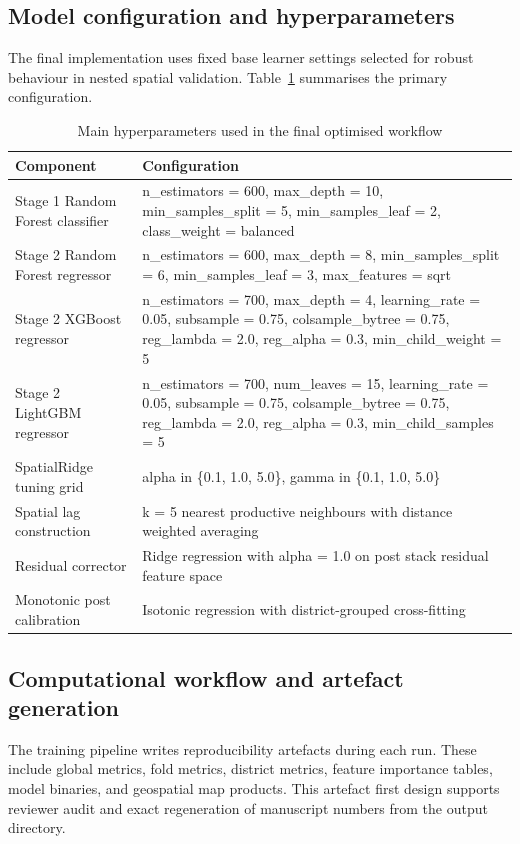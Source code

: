 \documentclass[preprint,12pt]{elsarticle}
\begin{document}
\subsection{Model configuration and hyperparameters}
The final implementation uses fixed base learner settings selected for robust behaviour in nested spatial validation. Table~\ref{tab:hyperparams} summarises the primary configuration.

\begin{table}[h]
\centering
\caption{Main hyperparameters used in the final optimised workflow}
\label{tab:hyperparams}
\begin{tabular}{p{4.1cm}p{9.8cm}}
\toprule
Component & Configuration \\
\midrule
Stage 1 Random Forest classifier & n\_estimators = 600, max\_depth = 10, min\_samples\_split = 5, min\_samples\_leaf = 2, class\_weight = balanced \\
Stage 2 Random Forest regressor & n\_estimators = 600, max\_depth = 8, min\_samples\_split = 6, min\_samples\_leaf = 3, max\_features = sqrt \\
Stage 2 XGBoost regressor & n\_estimators = 700, max\_depth = 4, learning\_rate = 0.05, subsample = 0.75, colsample\_bytree = 0.75, reg\_lambda = 2.0, reg\_alpha = 0.3, min\_child\_weight = 5 \\
Stage 2 LightGBM regressor & n\_estimators = 700, num\_leaves = 15, learning\_rate = 0.05, subsample = 0.75, colsample\_bytree = 0.75, reg\_lambda = 2.0, reg\_alpha = 0.3, min\_child\_samples = 5 \\
SpatialRidge tuning grid & alpha in \{0.1, 1.0, 5.0\}, gamma in \{0.1, 1.0, 5.0\} \\
Spatial lag construction & k = 5 nearest productive neighbours with distance weighted averaging \\
Residual corrector & Ridge regression with alpha = 1.0 on post stack residual feature space \\
Monotonic post calibration & Isotonic regression with district-grouped cross-fitting \\
\bottomrule
\end{tabular}
\end{table}

\subsection{Computational workflow and artefact generation}
The training pipeline writes reproducibility artefacts during each run. These include global metrics, fold metrics, district metrics, feature importance tables, model binaries, and geospatial map products. This artefact first design supports reviewer audit and exact regeneration of manuscript numbers from the output directory.
\end{document}
